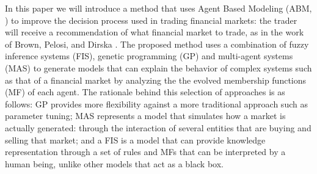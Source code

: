 \documentclass[a4paper,twoside]{article}
\begin{document}
In this paper we will introduce a method that uses Agent Based
Modeling (ABM, \cite{gilbert2008agent}) to improve the
decision process used in trading financial markets: the trader will receive a
recommendation of what financial market to trade, as in the work of
Brown, Pelosi, and Dirska \cite{brown2013dynamic}. The proposed 
method uses a combination of fuzzy inference systems (FIS), genetic
programming (GP) \cite{poli2008field} \cite{Koza1992} and multi-agent
systems (MAS) \cite{Shoham2009} to generate models that can explain the
behavior of complex systems such as that of a financial market by
analyzing the the evolved membership functions (MF) of each agent. %
%
%
The rationale behind this selection of approaches is as follows: GP
provides more flexibility against a more traditional approach such as
parameter tuning; MAS represents a model that simulates how a
market is actually generated: through the interaction of several entities
that are buying and selling that market; and a FIS is a model that can provide
knowledge representation through a set of rules and MFs that can be
interpreted by a human being, unlike other models that act as a
black box. %

\end{document}
